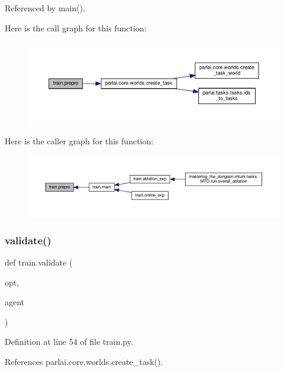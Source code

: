 Referenced by main().

Here is the call graph for this function\+:
\nopagebreak
\begin{figure}[H]
\begin{center}
\leavevmode
\includegraphics[width=350pt]{namespacetrain_a69347e6c50429f5076c376b70b1d8a27_cgraph}
\end{center}
\end{figure}
Here is the caller graph for this function\+:
\nopagebreak
\begin{figure}[H]
\begin{center}
\leavevmode
\includegraphics[width=350pt]{namespacetrain_a69347e6c50429f5076c376b70b1d8a27_icgraph}
\end{center}
\end{figure}
\mbox{\label{namespacetrain_a339ec8fa7ecbd096bb08716bd0b2aa94}} 
\subsubsection{\texorpdfstring{validate()}{validate()}}
{\footnotesize\ttfamily def train.\+validate (\begin{DoxyParamCaption}\item[{}]{opt,  }\item[{}]{agent }\end{DoxyParamCaption})}



Definition at line 54 of file train.\+py.



References parlai.\+core.\+worlds.\+create\+\_\+task().



